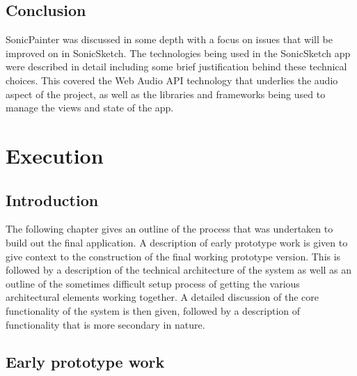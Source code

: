 \documentclass[12pt]{report}
\begin{document}
\chapter{Conclusion}
\label{sec:orge44d228}
SonicPainter was discussed in some depth with a focus on issues that will be
improved on in SonicSketch. The technologies being used in the SonicSketch app
were described in detail including some brief justification behind these
technical choices. This covered the Web Audio API technology that underlies the
audio aspect of the project, as well as the libraries and frameworks being used
to manage the views and state of the app.

\newpage

\part{Execution}
\label{sec:org36d7499}
\chapter{Introduction}
\label{sec:orgca7b8ad}
The following chapter gives an outline of the process that was undertaken to
build out the final application. A description of early prototype work is given
to give context to the construction of the final working prototype version. This
is followed by a description of the technical architecture of the system as well
as an outline of the sometimes difficult setup process of getting the various
architectural elements working together. A detailed discussion of the core
functionality of the system is then given, followed by a description of
functionality that is more secondary in nature.

\chapter{Early prototype work}
\label{sec:orge7f5328}
\end{document}
